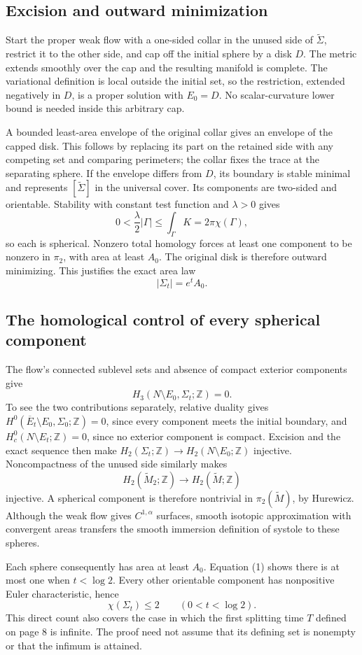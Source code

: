 \documentclass[10pt]{article}
\begin{document}
\subsection*{Excision and outward minimization}
Start the proper weak flow with a one-sided collar in the unused side of \(\widetilde\Sigma\), restrict it to the other side, and cap off the initial sphere by a disk \(D\). The metric extends smoothly over the cap and the resulting manifold is complete. The variational definition is local outside the initial set, so the restriction, extended negatively in \(D\), is a proper solution with \(E_0=D\). No scalar-curvature lower bound is needed inside this arbitrary cap.\par
A bounded least-area envelope of the original collar gives an envelope of the capped disk. This follows by replacing its part on the retained side with any competing set and comparing perimeters; the collar fixes the trace at the separating sphere. If the envelope differs from \(D\), its boundary is stable minimal and represents \([\widetilde\Sigma]\) in the universal cover. Its components are two-sided and orientable. Stability with constant test function and \(\lambda>0\) gives \[0<\frac{\lambda}{2}|\Gamma|
 \le \int_\Gamma K=2\pi\chi(\Gamma),\] so each is spherical. Nonzero total homology forces at least one component to be nonzero in \(\pi_2\), with area at least \(A_0\). The original disk is therefore outward minimizing. This justifies the exact area law \[|\Sigma_t|=e^t A_0.
 \tag{1}\]\par
\subsection*{The homological control of every spherical component}
The flow’s connected sublevel sets and absence of compact exterior components give \[H_3(N\setminus E_0,\Sigma_t;\mathbb Z)=0.\] To see the two contributions separately, relative duality gives \(H^0(\overline E_t\setminus E_0,\Sigma_0;\mathbb Z)=0\), since every component meets the initial boundary, and \(H_c^0(N\setminus E_t;\mathbb Z)=0\), since no exterior component is compact. Excision and the exact sequence then make \(H_2(\Sigma_t;\mathbb Z)\to H_2(N\setminus E_0;\mathbb Z)\) injective. Noncompactness of the unused side similarly makes \[H_2(\widetilde M_2;\mathbb Z)\longrightarrow H_2(\widetilde M;\mathbb Z)\] injective. A spherical component is therefore nontrivial in \(\pi_2(\widetilde M)\), by Hurewicz. Although the weak flow gives \(C^{1,\alpha}\) surfaces, smooth isotopic approximation with convergent areas transfers the smooth immersion definition of systole to these spheres.\par
Each sphere consequently has area at least \(A_0\). Equation (1) shows there is at most one when \(t<\log2\). Every other orientable component has nonpositive Euler characteristic, hence \[\chi(\Sigma_t)\le2\qquad(0<t<\log2).
 \tag{2}\] This direct count also covers the case in which the first splitting time \(T\) defined on page 8 is infinite. The proof need not assume that its defining set is nonempty or that the infimum is attained.\par
\end{document}
